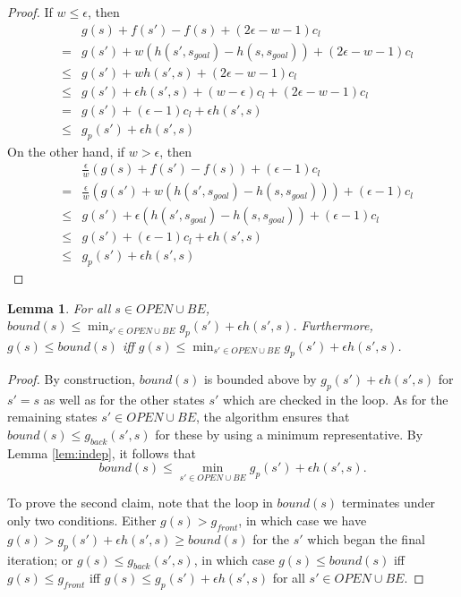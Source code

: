 \documentclass[letterpaper]{article}
\newtheorem{lemma}{Lemma}
\begin{document}
\begin{proof}
If $w \le \epsilon$, then
\begin{eqnarray*}
&&g(s) + f(s') - f(s) + (2\epsilon-w-1)c_l
\\&=& g(s') + w(h(s',s_{goal}) - h(s,s_{goal})) + (2\epsilon-w-1)c_l
\\&\le& g(s') + wh(s',s) + (2\epsilon-w-1)c_l
\\&\le& g(s') + \epsilon h(s',s) + (w-\epsilon)c_l + (2\epsilon-w-1)c_l
\\&=& g(s') + (\epsilon-1)c_l + \epsilon h(s',s)
\\&\le& g_p(s') + \epsilon h(s',s)
\end{eqnarray*}
On the other hand, if $w > \epsilon$, then
\begin{eqnarray*}
&&\frac\epsilon w\left(g(s) + f(s') - f(s)\right) + (\epsilon-1)c_l
\\&=& \frac\epsilon w\left(g(s') + w(h(s',s_{goal}) - h(s,s_{goal})) \right) + (\epsilon-1)c_l
\\&\le& g(s') + \epsilon(h(s',s_{goal}) - h(s,s_{goal})) + (\epsilon-1)c_l
\\&\le& g(s') + (\epsilon-1)c_l + \epsilon h(s',s)
\\&\le& g_p(s') + \epsilon h(s',s)
\end{eqnarray*}
\end{proof}

\begin{lemma}
\label{lem:bound}
For all $s\in OPEN\cup BE$, $bound(s) \le \min_{s'\in OPEN \cup BE} g_p(s') + \epsilon h(s',s)$. Furthermore, $g(s) \le bound(s)$ iff $g(s) \le \min_{s'\in OPEN \cup BE} g_p(s') + \epsilon h(s',s)$.
\end{lemma}

\begin{proof}
By construction, $bound(s)$ is bounded above by $g_p(s') + \epsilon h(s',s)$ for $s'=s$ as well as for the other states $s'$ which are checked in the loop. As for the remaining states $s' \in OPEN \cup BE$, the algorithm ensures that $bound(s) \le g_{back}(s',s)$ for these by using a minimum representative. By Lemma \ref{lem:indep}, it follows that
\[bound(s) \le \min_{s' \in OPEN \cup BE} g_p(s') + \epsilon h(s',s).\]

To prove the second claim, note that the loop in $bound(s)$ terminates under only two conditions. Either $g(s) > g_{front}$, in which case we have $g(s) > g_p(s') + \epsilon h(s',s) \ge bound(s)$ for the $s'$ which began the final iteration; or $g(s) \le g_{back}(s',s)$, in which case $g(s) \le bound(s)$ iff $g(s) \le g_{front}$ iff $g(s) \le g_p(s') + \epsilon h(s',s)$ for all $s' \in OPEN \cup BE$.
\end{proof}
\end{document}
